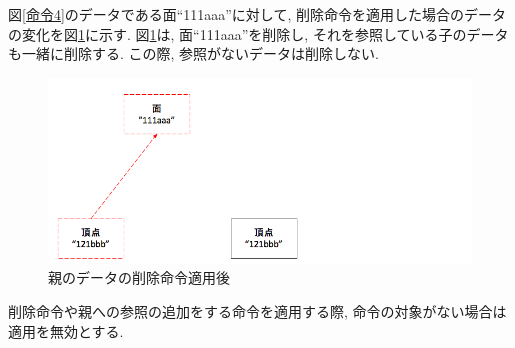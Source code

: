 図\ref{命令4}のデータである面``111aaa''に対して, 削除命令を適用した場合のデータの変化を図\ref{命令5}に示す. 図\ref{命令5}は, 面``111aaa''を削除し, それを参照している子のデータも一緒に削除する. この際, 参照がないデータは削除しない.
\begin{figure}[]
  \begin{center}
    \includegraphics[scale=0.45]{images/ope5}
    \caption{親のデータの削除命令適用後}
    \label{命令5}
  \end{center}
\end{figure}
削除命令や親への参照の追加をする命令を適用する際, 命令の対象がない場合は適用を無効とする.
